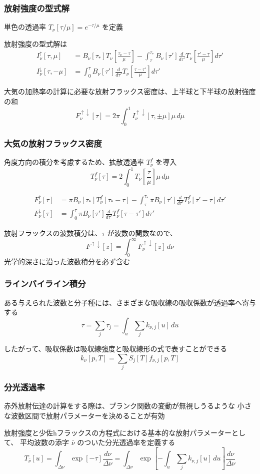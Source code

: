 \documentclass[unicode,colorlinks]{beamer}
\begin{document}
\begin{frame}
	\frametitle{放射強度の型式解}
	単色の透過率 $T_\nu[\tau/\mu]=e^{-\tau/\mu}$ を定義

	放射強度の型式解は
	\begin{align*}
		I^\uparrow_\nu[\tau,\mu]
			&=B_\nu[\tau_*]T_\nu\left[\frac{\tau_\nu-\tau}{\mu}\right]
			-\int^{\tau_*}_\tau B_\nu[\tau']\frac{d}{d\tau'}T_\nu\left[\frac{\tau'-\tau}{\mu}\right]d\tau'\\
		I^\downarrow_\nu[\tau,-\mu]
			&=\int^\tau_0 B_\nu[\tau']\frac{d}{d\tau'}T_\nu\left[\frac{\tau-\tau'}{\mu}\right]d\tau'
	\end{align*}

	大気の加熱率の計算に必要な放射フラックス密度は、上半球と下半球の放射強度の和
	\[F^{\uparrow\downarrow}_\nu[\tau]=2\pi\int^1_0 I^{\uparrow\downarrow}_\nu[\tau,\pm\mu]\mu\,d\mu\]
\end{frame}

\begin{frame}
	\frametitle{大気の放射フラックス密度}
	角度方向の積分を考慮するため、拡散透過率 $T^f_\nu$ を導入
	\[T^f_\nu[\tau]=2\int^1_0 T_\nu\left[\frac{\tau}{\mu}\right]\mu\,d\mu\]

	\begin{align*}
		F^\uparrow_\nu[\tau]
			&=\pi B_\nu[\tau_*]T^f_\nu[\tau_*-\tau]
			-\int^{\tau_*}_\tau \pi B_\nu[\tau']\frac{d}{d\tau'}T^f_\nu[\tau'-\tau]d\tau'\\
		F^\downarrow_\nu[\tau]
			&=\int^\tau_0 \pi B_\nu[\tau']\frac{d}{d\tau'}T^f_\nu[\tau-\tau']d\tau'
	\end{align*}

	放射フラックスの波数積分は、$\tau$ が波数の関数なので、
	\[F^{\uparrow\downarrow}[z]=\int^\infty_0 F^{\uparrow\downarrow}_\nu[z]\,d\nu\]
	光学的深さに沿った波数積分を必ず含む
\end{frame}

\begin{frame}
	\frametitle{ラインバイライン積分}
	ある与えられた波数と分子種には、さまざまな吸収線の吸収係数が透過率へ寄与する
	\[\tau=\sum_j \tau_j=\int_u\sum_j k_{\nu,j}[u]\,du\]

	したがって、吸収係数は吸収線強度と吸収線形の式で表すことができる
	\[k_\nu[p,T]=\sum_j S_j[T]f_{\nu,j}[p,T]\]
\end{frame}

\begin{frame}
	\frametitle{分光透過率}
	赤外放射伝達の計算をする際は、プランク関数の変動が無視しうるような
	小さな波数区間で放射パラメーターを決めることが有効

	放射強度と少佐hフラックスの方程式における基本的な放射パラメーターとして、
	平均波数の添字 $\bar\nu$ のついた分光透過率を定義する
	\[
		T_{\bar\nu}[u]
		=\int_{\Delta\nu}\exp[-\tau]\frac{d\nu}{\Delta\nu}
		=\int_{\Delta\nu}\exp\left[-\int_u\sum_j k_{\nu,j}[u]\,du\right]\frac{d\nu}{\Delta\nu}
	\]
\end{frame}
\end{document}
